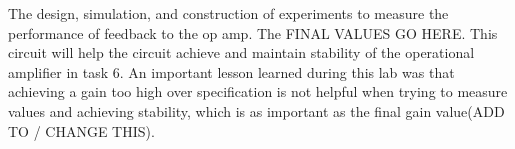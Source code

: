 

The design, simulation, and construction of experiments to measure the performance of feedback to the op amp. The FINAL VALUES GO HERE. This circuit will help the circuit achieve and maintain stability of the operational amplifier in task 6.  An important lesson learned during this lab was that achieving a gain too high over specification is not helpful when trying to measure values and achieving stability, which is as important as the final gain value(ADD TO / CHANGE THIS).
